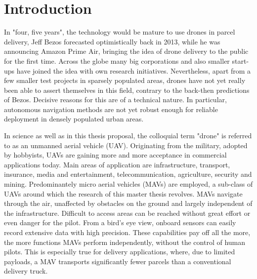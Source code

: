 
\chapter{Introduction} %

\label{Chapter1} %

In "four, five years", the technology would be mature to use drones in parcel delivery,
Jeff Bezos forecasted optimistically back in 2013, 
while he was announcing Amazon Prime Air,
bringing the idea of drone delivery to the public for the first time. \cite{Hamilton2019}
Across the globe many big corporations and also smaller start-ups have
joined the idea with own research initiatives.
Nevertheless, apart from a few smaller test projects in sparsely populated areas, 
drones have not yet really been able to assert themselves in this field,
contrary to the back-then predictions of Bezos.
Decisive reasons for this are of a technical nature.
In particular, autonomous navigation methods are not yet robust enough 
for reliable deployment in densely populated urban areas. \cite{loquercio2018learning}

In science as well as in this thesis proposal, 
the colloquial term "drone" is referred to as an unmanned aerial vehicle (UAV).
Originating from the military, adopted by hobbyists,
UAVs are gaining more and more acceptance in commercial applications today.
Main areas of application are 
infrastructure, transport, insurance, media and entertainment, telecommunication, agriculture, security and mining. \cite{PwC2016}
Predominantely micro aerial vehicles (MAVs) are employed,
a sub-class of UAVs around which the research of this master thesis revolves.
MAVs navigate through the air, unaffected by obstacles on the ground and largely independent of the infrastructure. 
Difficult to access areas can be reached without great effort or even danger for the pilot.
From a bird's eye view, onboard sensors can easily record extensive data with high precision.
These capabilities pay off all the more,
the more functions MAVs perform independently, without the control of human pilots.
This is especially true for delivery applications, 
where, due to limited payloads, a MAV transports significantly fewer parcels than a conventional delivery truck.

